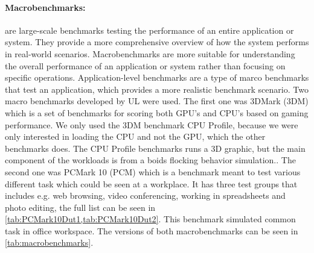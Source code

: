 \paragraph{Macrobenchmarks:} are large-scale benchmarks testing the performance of an entire application or system. They provide a more comprehensive overview of how the system performs in real-world scenarios. Macrobenchmarks are more suitable for understanding the overall performance of an application or system rather than focusing on specific operations.\cite{MicroVSMacro} Application-level benchmarks are a type of marco benchmarks that test an application, which provides a more realistic benchmark scenario. Two macro benchmarks developed by UL were used. The first one was 3DMark (3DM) which is a set of benchmarks for scoring both GPU's and CPU's based on gaming performance. We only used the 3DM benchmark CPU Profile, because we were only interested in loading the CPU and not the GPU, which the other benchmarks does. The CPU Profile benchmarks runs a 3D graphic, but the main component of the workloads is from a boids flocking behavior simulation.\cite{3dmark}. The second one was PCMark 10 (PCM) which is a benchmark meant to test various different task which could be seen at a workplace. It has three test groups that includes e.g. web browsing, video conferencing, working in spreadsheets and photo editing, the full list can be seen in \cref{tab:PCMark10Dut1,tab:PCMark10Dut2}. This benchmark simulated common task in office workspace.\cite{pcmark} The versions of both macrobenchmarks can be seen in \cref{tab:macrobenchmarks}.

